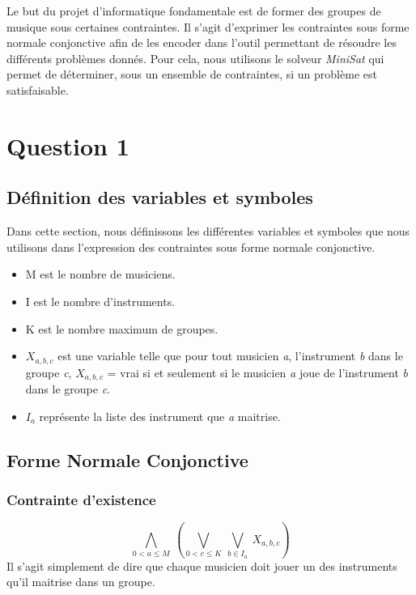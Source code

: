 \documentclass[11pt]{article}
\begin{document}
Le but du projet d'informatique fondamentale est de former des groupes de musique sous certaines contraintes. Il s'agit d'exprimer les contraintes sous forme normale conjonctive afin de les encoder dans l'outil permettant de résoudre les différents problèmes donnés. Pour cela, nous utilisons le solveur \textit{MiniSat} qui permet de déterminer, sous un ensemble de contraintes, si un problème est satisfaisable.

\section{Question 1}

\subsection{Définition des variables et symboles}

Dans cette section, nous définissons les différentes variables et symboles que nous utilisons dans l'expression des contraintes sous forme normale conjonctive.

\begin{itemize}
\item M est le nombre de musiciens.
\item I est le nombre d'instruments.
\item K est le nombre maximum de groupes.
\item $X_{a,b,c}$ est une variable telle que pour tout musicien \textit{a}, l'instrument \textit{b} dans le groupe \textit{c}, $X_{a,b,c}$ = vrai si et seulement si le musicien \textit{a} joue de l’instrument \textit{b} dans le groupe \textit{c}.
\item $I_a$ représente la liste des instrument que \textit{a} maitrise.
\end{itemize}

\subsection{Forme Normale Conjonctive}

\subsubsection{Contrainte d'existence}

$$\bigwedge\limits_{0<a\le M}\ \left(\bigvee\limits_{0<c\le K}\ \bigvee\limits_{b\in I_a}\ X_{a,b,c}\right)$$
Il s'agit simplement de dire que chaque musicien doit jouer un des instruments qu'il maitrise dans un groupe.
\end{document}
